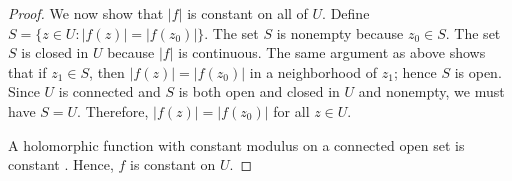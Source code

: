 \begin{proof}
We now show that $|f|$ is constant on all of $U$. Define $S = \{ z \in U : |f(z)| = |f(z_0)| \}$. The set $S$ is nonempty because $z_0 \in S$. The set $S$ is closed in $U$ because $|f|$ is continuous. The same argument as above shows that if $z_1 \in S$, then $|f(z)| = |f(z_0)|$ in a neighborhood of $z_1$; hence $S$ is open. Since $U$ is connected and $S$ is both open and closed in $U$ and nonempty, we must have $S = U$. Therefore, $|f(z)| = |f(z_0)|$ for all $z \in U$.

A holomorphic function with constant modulus on a connected open set is constant . Hence, $f$ is constant on $U$.
\end{proof}
